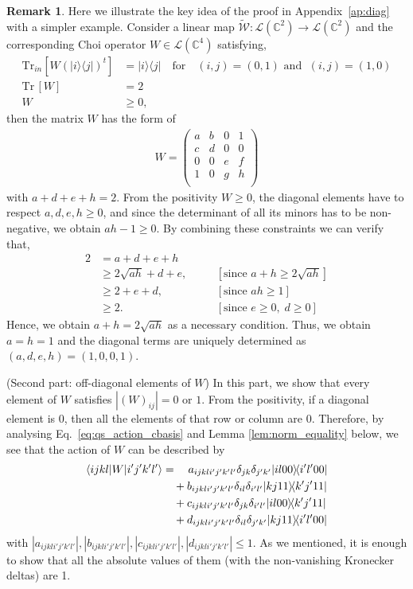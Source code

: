 \documentclass[a4paper,twocolumn,accepted=2022-10-23]{quantumarticle}
\newcommand{\bra}[1]{\langle {#1} \vert}
\newcommand{\ket}[1]{\vert {#1} \rangle}
\newcommand{\ketbra}[2]{\vert {#1} \rangle\!\langle {#2} \vert}
\newcommand{\Tr}[0]{{\mathrm{Tr}}}
\newcommand{\lcal}[0]{{\mathcal{L}}}
\newcommand{\tmap}[1]{\widetilde{\mbox{$\mathcal{#1}$}}}
\theoremstyle{definition}
\newtheorem{rem}{Remark}
\begin{document}
\begin{rem}
Here we illustrate the key idea of the proof in Appendix~\ref{ap:diag} with a simpler example.
Consider a linear map $\tmap{W} : \lcal(\mathbb{C}^2) \to \lcal(\mathbb{C}^2)$ and the corresponding Choi operator $W \in \lcal ( \mathbb{C}^4 )$ satisfying,
\begin{align}
\Tr_{in} [W (\ketbra{i}{j})^t] &= \ketbra{i}{j} \quad \mbox{for} \quad (i,j)=(0,1) \text{ and }\; (i,j)=(1,0) \\
\Tr\, [W] &= 2 \\
W &\geq 0,
\end{align}
then the matrix $W$ has the form of
\begin{align}
W =
\begin{pmatrix}
a & b & 0 & 1 \\
c & d & 0 & 0 \\
0 & 0 & e & f \\
1 & 0 & g & h \\
\end{pmatrix}
\end{align}
with $a+d+e+h = 2$.
From the positivity $W \geq 0$, the diagonal elements have to respect $a,d,e,h \geq 0$, and since the determinant of all its minors has to be non-negative, we obtain $ah-1 \geq 0$. By combining these constraints we can verify that,
\begin{align}
	2 &= a+d+e+h \\
	  & \geq 2 \sqrt{ah} + d + e, \quad &&\left[ \text{since } a+h\geq 2\sqrt{ah}   \right] \\
	  & \geq 2+ e + d, \quad &&\left[ \text{since } ah\geq 1  \right] \\
	  & \geq 2. \quad &&\left[ \text{since } e\geq0, \; d\geq0  \right]
\end{align}
Hence, we obtain $ a+h = 2\sqrt{ah}$ as a necessary condition.
Thus, we obtain $a=h=1$ and the diagonal terms are uniquely determined as $(a,d,e,h) = (1,0,0,1)$.
\end{rem}

(Second part: off-diagonal elements of $W$)\quad
In this part, we show that every element of $W$ satisfies $| (W)_{ij} | = 0 \mbox{ or } 1$.
From the positivity, if a diagonal element is 0, then all the elements of that row or column are 0.
Therefore, by analysing Eq.~\eqref{eq:qs_action_cbasis} and Lemma \ref{lem:norm_equality} below, we see that the action of $W$ can be described by
\begin{align}
\bra{ijkl} W \ket{i'j'k'l'}
&=\quad a_{ijkli'j'k'l'} \delta_{jk}\delta_{j'k'} \ketbra{il00}{i'l'00} \notag \\
&\quad+ b_{ijkli'j'k'l'} \delta_{il}\delta_{i'l'} \ketbra{kj11}{k'j'11} \notag \\
&\quad + c_{ijkli'j'k'l'} \delta_{jk}\delta_{i'l'} \ketbra{il00}{k'j'11} \notag \\
&\quad+ d_{ijkli'j'k'l'} \delta_{il}\delta_{j'k'} \ketbra{kj11}{i'l'00} \label{eq:qs_action_abcd}
\end{align}
with $|a_{ijkli'j'k'l'}|, |b_{ijkli'j'k'l'}|, |c_{ijkli'j'k'l'}|, |d_{ijkli'j'k'l'}| \leq 1$.
As we mentioned, it is enough to show that all the absolute values of them (with the non-vanishing Kronecker deltas) are 1.
\end{document}
